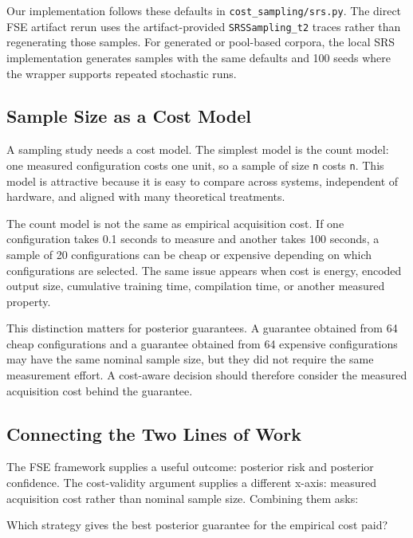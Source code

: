 \documentclass[smallcondensed]{svjour3}
\newenvironment{Shaded}{}{}
\newcommand{\NormalTok}[1]{#1}
\begin{document}
Our implementation follows these defaults in
\texttt{cost\_sampling/srs.py}. The direct FSE artifact rerun uses the
artifact-provided \texttt{SRSSampling\_t2} traces rather than
regenerating those samples. For generated or pool-based corpora, the
local SRS implementation generates samples with the same defaults and
100 seeds where the wrapper supports repeated stochastic runs.

\subsection{Sample Size as a Cost
Model}\label{sample-size-as-a-cost-model}

A sampling study needs a cost model. The simplest model is the count
model: one measured configuration costs one unit, so a sample of size
\texttt{n} costs \texttt{n}. This model is attractive because it is easy
to compare across systems, independent of hardware, and aligned with
many theoretical treatments.

The count model is not the same as empirical acquisition cost. If one
configuration takes 0.1 seconds to measure and another takes 100
seconds, a sample of 20 configurations can be cheap or expensive
depending on which configurations are selected. The same issue appears
when cost is energy, encoded output size, cumulative training time,
compilation time, or another measured property.

This distinction matters for posterior guarantees. A guarantee obtained
from 64 cheap configurations and a guarantee obtained from 64 expensive
configurations may have the same nominal sample size, but they did not
require the same measurement effort. A cost-aware decision should
therefore consider the measured acquisition cost behind the guarantee.

\subsection{Connecting the Two Lines of
Work}\label{connecting-the-two-lines-of-work}

The FSE framework supplies a useful outcome: posterior risk and
posterior confidence. The cost-validity argument supplies a different
x-axis: measured acquisition cost rather than nominal sample size.
Combining them asks:

\begin{Shaded}
\begin{Highlighting}[]
\NormalTok{Which strategy gives the best posterior guarantee for the empirical cost paid?}
\end{Highlighting}
\end{Shaded}
\end{document}
